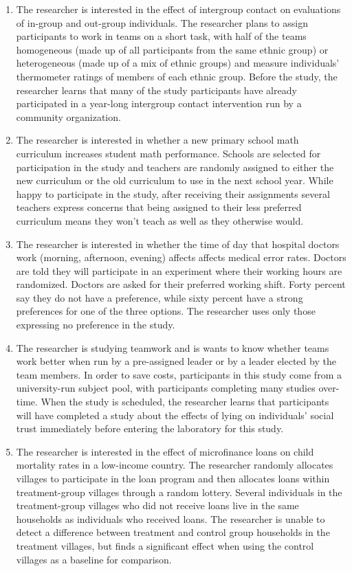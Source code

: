 \documentclass[12pt,a4]{article}
\begin{document}
\begin{enumerate}
\item The researcher is interested in the effect of intergroup contact on evaluations of in-group and out-group individuals. The researcher plans to assign participants to work in teams on a short task, with half of the teams homogeneous (made up of all participants from the same ethnic group) or heterogeneous (made up of a mix of ethnic groups) and measure individuals' thermometer ratings of members of each ethnic group. Before the study, the researcher learns that many of the study participants have already participated in a year-long intergroup contact intervention run by a community organization. %

\item The researcher is interested in whether a new primary school math curriculum increases student math performance. Schools are selected for participation in the study and teachers are randomly assigned to either the new curriculum or the old curriculum to use in the next school year. While happy to participate in the study, after receiving their assignments several teachers express concerns that being assigned to their less preferred curriculum means they won't teach as well as they otherwise would. %

\item The researcher is interested in whether the time of day that hospital doctors work (morning, afternoon, evening) affects affects medical error rates. Doctors are told they will participate in an experiment where their working hours are randomized. Doctors are asked for their preferred working shift. Forty percent say they do not have a preference, while sixty percent have a strong preferences for one of the three options. The researcher uses only those expressing no preference in the study. %

\item The researcher is studying teamwork and is wants to know whether teams work better when run by a pre-assigned leader or by a leader elected by the team members. In order to save costs, participants in this study come from a university-run subject pool, with participants completing many studies over-time. When the study is scheduled, the researcher learns that participants will have completed a study about the effects of lying on individuals' social trust immediately before entering the laboratory for this study. %

\item The researcher is interested in the effect of microfinance loans on child mortality rates in a low-income country. The researcher randomly allocates villages to participate in the loan program and then allocates loans within treatment-group villages through a random lottery. Several individuals in the treatment-group villages who did not receive loans live in the same households as individuals who received loans. The researcher is unable to detect a difference between treatment and control group households in the treatment villages, but finds a significant effect when using the control villages as a baseline for comparison. %

\end{enumerate}
\end{document}
